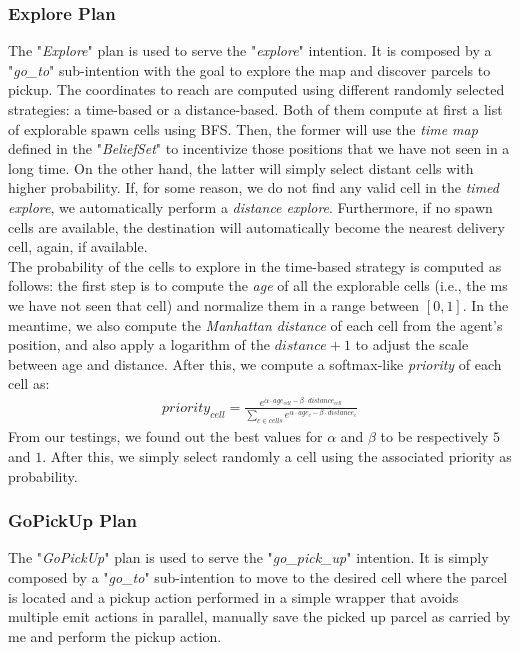         \subsubsection{Explore Plan}
            The "\textit{Explore}" plan is used to serve the "\textit{explore}" intention. It is composed by a "\textit{go\_to}" sub-intention with the goal to explore the map and discover parcels to pickup. The coordinates to reach are computed using different randomly selected strategies: a time-based or a distance-based. Both of them compute at first a list of explorable spawn cells using BFS. Then, the former will use the \textit{time map} defined in the "\textit{BeliefSet}" to incentivize those positions that we have not seen in a long time. On the other hand, the latter will simply select distant cells with higher probability. If, for some reason, we do not find any valid cell in the \textit{timed explore}, we automatically perform a \textit{distance explore}. Furthermore, if no spawn cells are available, the destination will automatically become the nearest delivery cell, again, if available.
            \medskip\\
            The probability of the cells to explore in the time-based strategy is computed as follows: the first step is to compute the \textit{age} of all the explorable cells (i.e., the ms we have not seen that cell) and normalize them in a range between $[0, 1]$. In the meantime, we also compute the \textit{Manhattan distance} of each cell from the agent's position, and also apply a logarithm of the $distance + 1$ to adjust the scale between age and distance. After this, we compute a softmax-like \textit{priority} of each cell as:
            \begin{gather*}
                priority_{cell} = \frac{e^{\alpha \cdot age_{cell} - \beta \cdot distance_{cell}}}{\sum_{c \in cells}e^{\alpha \cdot age_c - \beta \cdot distance_c}}
            \end{gather*}
            From our testings, we found out the best values for $\alpha$ and $\beta$ to be respectively $5$ and $1$. After this, we simply select randomly a cell using the associated priority as probability.

        \subsubsection{GoPickUp Plan}
            The "\textit{GoPickUp}" plan is used to serve the "\textit{go\_pick\_up}" intention. It is simply composed by a "\textit{go\_to}" sub-intention to move to the desired cell where the parcel is located and a pickup action performed in a simple wrapper that avoids multiple emit actions in parallel, manually save the picked up parcel as carried by me and perform the pickup action. 


